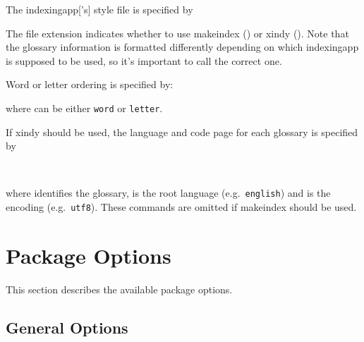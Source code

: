 \documentclass[report]{nlctdoc}
\begin{document}
The \gls{indexingapp}['s] style file is specified by
\begin{definition}[\DescribeMacro{\@istfilename}]
\end{definition}
The file extension indicates whether to use \gls{makeindex}
() or \gls{xindy} (). Note that
the glossary information is formatted differently depending on
which \gls*{indexingapp} is supposed to be used, so it's 
important to call the correct one.

Word or letter ordering is specified by:
\begin{definition}[\DescribeMacro{\@glsorder}]
\end{definition}
where  can be either \texttt{word} or \texttt{letter}.

If \gls{xindy} should be used, the language and code page
for each glossary is specified by
\begin{definition}[\DescribeMacro{\@xdylanguage}\DescribeMacro{\@gls@codepage}]
\\
\end{definition}
where  identifies the glossary,  is
the root language (e.g.\ \texttt{english}) and 
is the encoding (e.g.\ \texttt{utf8}). These commands are omitted
if \gls{makeindex} should be used.


\chapter{Package Options}
\label{sec:pkgopts}

This section describes the available  package options.

\section{General Options}
\label{sec:pkgopts-general}
\end{document}
